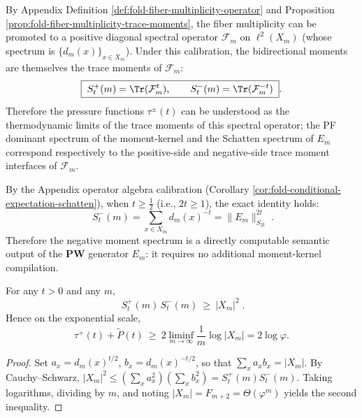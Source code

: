 \begin{remark}[Spectral operator realization of space loss: \texorpdfstring{$\mathcal{F}_m=(E_mE_m^\ast)^{-1}$}{Fm=(EmEm*)^{-1}}]\label{rem:pom-fiber-loss-as-spectral-operator}
By Appendix Definition \ref{def:fold-fiber-multiplicity-operator} and Proposition \ref{prop:fold-fiber-multiplicity-trace-moments}, the fiber multiplicity can be promoted to a positive diagonal spectral operator \(\mathcal{F}_m\) on \(\ell^2(X_m)\) (whose spectrum is \(\{d_m(x)\}_{x\in X_m}\)).
Under this calibration, the bidirectional moments are themselves the trace moments of \(\mathcal{F}_m\):
$$
\boxed{\;
S^{+}_{t}(m)=\Tr(\mathcal{F}_m^{t}),\qquad
S^{-}_{t}(m)=\Tr(\mathcal{F}_m^{-t})\; }.
$$
Therefore the pressure functions \(\tau^{\pm}(t)\) can be understood as the thermodynamic limits of the trace moments of this spectral operator; the PF dominant spectrum of the moment-kernel and the Schatten spectrum of \(E_m\) correspond respectively to the positive-side and negative-side trace moment interfaces of \(\mathcal{F}_m\).
\end{remark}

\begin{remark}\label{rem:pom-negative-moment-from-schatten}
By the Appendix operator algebra calibration (Corollary \ref{cor:fold-conditional-expectation-schatten}), when \(t\ge \frac12\) (i.e., \(2t\ge 1\)), the exact identity holds:
$$
\boxed{\;
S^{-}_{t}(m)=\sum_{x\in X_m}d_m(x)^{-t}=\|E_m\|_{S_{2t}}^{2t}\;}.
$$
Therefore the negative moment spectrum is a directly computable semantic output of the \(\mathbf{PW}\) generator \(E_m\): it requires no additional moment-kernel compilation.
\end{remark}

\begin{proposition}\label{prop:pom-positive-negative-coupling}
For any \(t>0\) and any \(m\),
$$
\boxed{\;
S^{+}_{t}(m)\,S^{-}_{t}(m)\ \ge\ |X_m|^2\; }.
$$
Hence on the exponential scale,
$$
\tau^{+}(t)+\widetilde P(t)\ \ge\ 2\liminf_{m\to\infty}\frac{1}{m}\log|X_m|
=2\log\varphi.
$$
\end{proposition}
\begin{proof}
Set \(a_x=d_m(x)^{t/2}\), \(b_x=d_m(x)^{-t/2}\), so that \(\sum_x a_xb_x=|X_m|\).
By Cauchy--Schwarz,
\(
|X_m|^2\le (\sum_x a_x^2)(\sum_x b_x^2)=S_t^+(m)S_t^-(m)
\).
Taking logarithms, dividing by \(m\), and noting \(|X_m|=F_{m+2}=\Theta(\varphi^m)\) yields the second inequality.
\end{proof}

